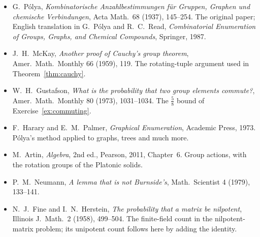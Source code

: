 \begin{itemize}
\item G.~P\'olya, \emph{Kombinatorische Anzahlbestimmungen f\"ur Gruppen, Graphen und chemische Verbindungen}, Acta Math.\ 68 (1937), 145--254. The original paper; English translation in G.~P\'olya and R.~C.~Read, \emph{Combinatorial Enumeration of Groups, Graphs, and Chemical Compounds}, Springer, 1987.
\item J.~H.~McKay, \emph{Another proof of Cauchy's group theorem}, Amer.\ Math.\ Monthly 66 (1959), 119. The rotating-tuple argument used in Theorem~\ref{thm:cauchy}.
\item W.~H.~Gustafson, \emph{What is the probability that two group elements commute?}, Amer.\ Math.\ Monthly 80 (1973), 1031--1034. The $\frac58$ bound of Exercise~\ref{ex:commuting}.
\item F.~Harary and E.~M.~Palmer, \emph{Graphical Enumeration}, Academic Press, 1973. P\'olya's method applied to graphs, trees and much more.
\item M.~Artin, \emph{Algebra}, 2nd ed., Pearson, 2011, Chapter~6. Group actions, with the rotation groups of the Platonic solids.
\item P.~M.~Neumann, \emph{A lemma that is not Burnside's}, Math.\ Scientist 4 (1979), 133--141.
\item N.~J.~Fine and I.~N.~Herstein, \emph{The probability that a matrix be nilpotent}, Illinois J.\ Math.\ 2 (1958), 499--504. The finite-field count in the nilpotent-matrix problem; its unipotent count follows here by adding the identity.
\end{itemize}
